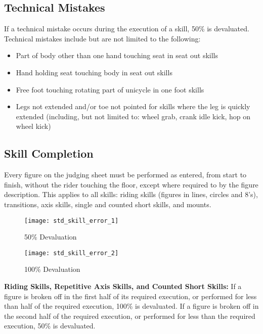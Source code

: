 \subsection{Technical Mistakes}
If a technical mistake occurs during the execution of a skill, 50\% is devaluated.
Technical mistakes include but are not limited to the following: 
\begin{itemize}
\item Part of body other than one hand touching seat in seat out skills
\item Hand holding seat touching body in seat out skills
\item Free foot touching rotating part of unicycle in one foot skills
\item Legs not extended and/or toe not pointed for skills where the leg is quickly extended (including, but not limited to: wheel grab, crank idle kick, hop on wheel kick)
\end{itemize}

\subsection{Skill Completion \label{subsec:freestyle_difficulty-devaluations_skill-completion}}
Every figure on the judging sheet must be performed as entered, from start to finish, without the rider touching the floor, except where required to by the figure description.
This applies to all skills: riding skills (figures in lines, circles and 8's), transitions, axis skills, single and counted short skills, and mounts.

\begin{wrapfigure}{l}{0.35\textwidth}
\vspace{-25pt}
\begin{center}
\texttt{[image: std\_skill\_error\_1]}
\end{center}
\vspace{-20pt}
\caption{50\% Devaluation \label{fig:std_skill_error_1}}
\vspace{-5pt}
\begin{center}
\texttt{[image: std\_skill\_error\_2]}
\end{center}
\vspace{-20pt}
\caption{100\% Devaluation\label{fig:std_skill_error_2}}
\vspace{-25pt}
\end{wrapfigure}

\textbf{Riding Skills, Repetitive Axis Skills, and Counted Short Skills:} If a figure is broken off in the first half of its required execution, or performed for less than half of the required execution, 100\% is devaluated.
If a figure is broken off in the second half of the required execution, or performed for less than the required execution, 50\% is devaluated.

